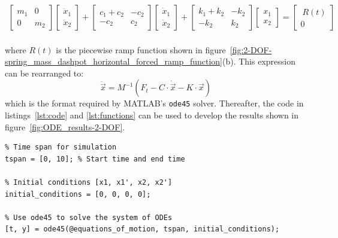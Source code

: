 \documentclass[12pt,letter]{article}
\begin{document}
\begin{example}
    \begin{eqnarray}
      \begin{bmatrix} m_1 & 0  \\  0 & m_2 \end{bmatrix}\begin{bmatrix} \ddot{x}_1 \\  \ddot{x}_2 \end{bmatrix} + \begin{bmatrix} c_1+c_2 & -c_2  \\  -c_2 & c_2 \end{bmatrix}\begin{bmatrix} \dot{x}_1 \\  \dot{x}_2 \end{bmatrix} + \begin{bmatrix} k_1+k_2 & -k_2  \\  -k_2 & k_2 \end{bmatrix}\begin{bmatrix} x_1 \\  x_2 \end{bmatrix}  = \begin{bmatrix} \ R(t) \\  0 \end{bmatrix}
    \end{eqnarray} \\
where $R(t)$ is the piecewise ramp function shown in figure~\ref{fig:2-DOF-spring_mass_dashpot_horizontal_forced_ramp_function}(b). This expression can be rearranged to:    
\begin{equation}
\ddot{\vec{x}} = M^{-1}(F_t - C \cdot \dot{\vec{x}} -K \cdot \vec{x})
\end{equation}
which is the format required by MATLAB's \texttt{ode45} solver. Thereafter, the code in listings~\ref{lst:code} and \ref{lst:functions} can be used to develop the results shown in figure~\ref{fig:ODE_results-2-DOF}. 


   


 

\begin{lstlisting}
% Time span for simulation
tspan = [0, 10]; % Start time and end time

% Initial conditions [x1, x1', x2, x2']
initial_conditions = [0, 0, 0, 0];

% Use ode45 to solve the system of ODEs
[t, y] = ode45(@equations_of_motion, tspan, initial_conditions);


\end{lstlisting}
\end{example}
\end{document}
